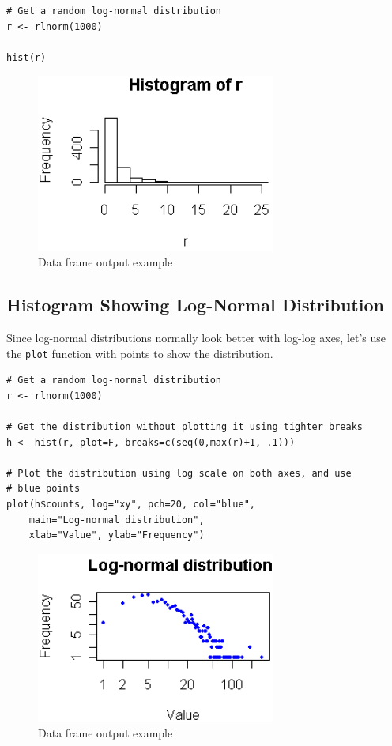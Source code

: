 \documentclass[10pt]{book}
\begin{document}
\begin{lstlisting}
# Get a random log-normal distribution
r <- rlnorm(1000)

hist(r)
\end{lstlisting}
\begin{figure}[H]
    \begin{flushleft}
        \includegraphics[width=0.7\textwidth]{hist_script5.png}
        \caption{Data frame output example}
        \label{fig:dataframe}
    \end{flushleft}
\end{figure}

\subsection*{Histogram Showing Log-Normal Distribution}
Since log-normal distributions normally look better with log-log axes, let's use the \texttt{plot} function with points to show the distribution.

\begin{lstlisting}
# Get a random log-normal distribution
r <- rlnorm(1000)

# Get the distribution without plotting it using tighter breaks
h <- hist(r, plot=F, breaks=c(seq(0,max(r)+1, .1)))

# Plot the distribution using log scale on both axes, and use
# blue points
plot(h$counts, log="xy", pch=20, col="blue",
	main="Log-normal distribution",
	xlab="Value", ylab="Frequency")
\end{lstlisting}
\begin{figure}[H]
    \begin{flushleft}
        \includegraphics[width=0.7\textwidth]{hist_script6.png}
        \caption{Data frame output example}
        \label{fig:dataframe}
    \end{flushleft}
\end{figure}
\end{document}
